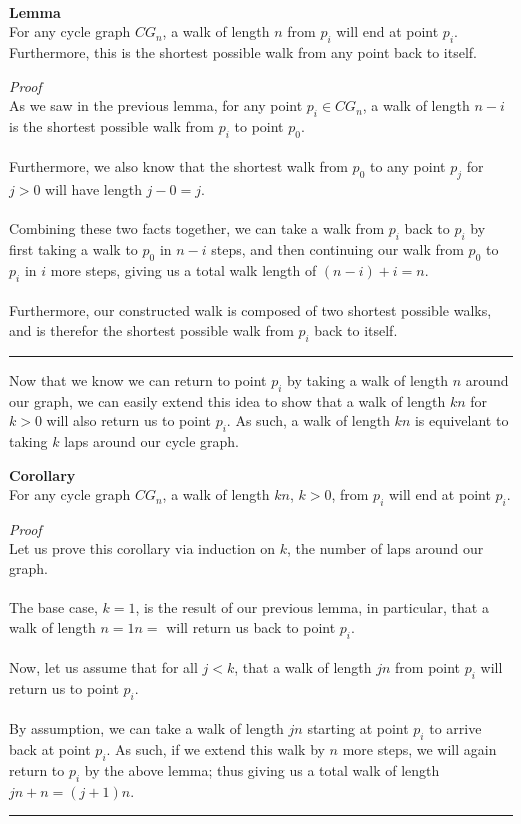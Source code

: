 \documentclass[a4paper,12pt]{article}
\begin{document}
\\
\begin{tcolorbox}
\textbf{Lemma}\\
For any cycle graph $CG_n$, a walk of length $n$ from $p_i$ will end at point $p_i$. Furthermore, this is the shortest possible walk from any point back to itself.
\end{tcolorbox}
\noindent
\textit{Proof}\\
As we saw in the previous lemma, for any point $p_i \in CG_n$, a walk of length $n - i$ is the shortest possible walk from $p_i$ to point $p_0$.\\
\\
Furthermore, we also know that the shortest walk from $p_0$ to any point $p_j$ for $j > 0$ will have length $j - 0 = j$.\\
\\
Combining these two facts together, we can take a walk from $p_i$ back to $p_i$ by first taking a walk to $p_0$ in $n - i$ steps, and then continuing our walk from $p_0$ to $p_i$ in $i$ more steps, giving us a total walk length of $(n - i) + i = n$.\\
\\
Furthermore, our constructed walk is composed of two shortest possible walks, and is therefor the shortest possible walk from $p_i$ back to itself.
\begin{center}
\noindent\rule{8cm}{0.4pt}
\end{center} 

Now that we know we can return to point $p_i$ by taking a walk of length $n$ around our graph, we can easily extend this idea to show that a walk of length $kn$ for $k > 0$ will also return us to point $p_i$. As such, a walk of length $kn$ is equivelant to taking $k$ laps around our cycle graph.\\ 
\begin{tcolorbox}
\textbf{Corollary}\\
For any cycle graph $CG_n$, a walk of length $kn$, $k > 0$, from $p_i$ will end at point $p_i$.
\end{tcolorbox}
\noindent
\textit{Proof}\\
Let us prove this corollary via induction on $k$, the number of laps around our graph.\\
\\
The base case, $k=1$, is the result of our previous lemma, in particular, that a walk of length $n = 1n=$ will return us back to point $p_i$.\\
\\
Now, let us assume that for all $j < k$, that a walk of length $jn$ from point $p_i$ will return us to point $p_i$.\\
\\
By assumption, we can take a walk of length $jn$ starting at point $p_i$ to arrive back at point $p_i$. As such, if we extend this walk by $n$ more steps, we will again return to $p_i$ by the above lemma; thus giving us a total walk of length $jn +n = (j+1)n$.
\begin{center}
\noindent\rule{8cm}{0.4pt}
\end{center} 
\end{document}
